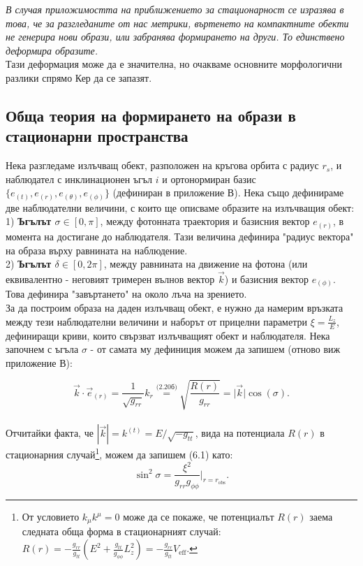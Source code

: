 \emph{В случая приложимостта на приближението за стационарност се изразява в това, че за разгледаните от нас метрики, въртенето на компактните обекти не генерира нови образи, или забранява формирането на други. То единствено деформира образите.}\\

Тази деформация може да е значителна, но очакваме основните морфологични разлики спрямо Кер да се запазят.

\subsection{Обща теория на формирането на образи в стационарни пространства}

Нека разгледаме излъчващ обект, разположен на кръгова орбита с радиус $r_s$, и наблюдател с инклинационен ъгъл $i$ и ортонормиран базис $\{e_{(t)}, e_{(r)}, e_{(\theta)}, e_{(\phi)}\}$ (дефиниран в приложение В). Нека също дефинираме две наблюдателни величини, с които ще описваме образите на излъчващия обект:\\

1) \textbf{Ъгълът $\sigma\in[0,\pi]$}, между фотонната траектория и базисния вектор $e_{(r)}$, в момента на достигане до наблюдателя. Тази величина дефинира "радиус вектора" на образа върху равнината на наблюдение.\\

2) \textbf{Ъгълът $\delta\in[0,2\pi]$}, между равнината на движение на фотона (или еквивалентно - неговият тримерен вълнов вектор $\vec{k}$) и базисния вектор $e_{(\phi)}$. Това дефинира "завъртането" на около лъча на зрението.\\

За да построим образа на даден излъчващ обект, е нужно да намерим връзката между тези наблюдателни величини и наборът от прицелни параметри $\xi = \frac{L_z}{E}$, дефиниращи криви, които свързват излъчващият обект и наблюдателя. Нека започнем с ъгъла $\sigma$ - от самата му дефиниция можем да запишем (отново виж приложение В):

\begin{equation}
	\vec{k} \cdot \vec{e}_{(r)} = \frac{1}{\sqrt{g_{rr}}}k_{r} \stackrel{\text{(2.20б)}}{=} \sqrt{\frac{R(r)}{g_{rr}}} =  \big\vert \vec{k}\big\vert \cos(\sigma).
\end{equation}\\
Отчитайки факта, че $|\vec{k}| = k^{(t)} = E/\sqrt{-g_{tt}}$,  вида на потенциала $R(r)$ в стационарния случай\footnote{От условието $k_\mu k^\mu = 0$ може да се покаже, че потенциалът $R(r)$ заема следната обща форма в стационарният случай: $R(r) = -\frac{g_{rr}}{g_{tt}}\left(E^2 + \frac{g_{tt}}{g_{\phi\phi}}L_z^2\right) = -\frac{g_{rr}}{g_{tt}} V_\text{eff}$.}, можем да запишем (6.1) като:
\begin{equation}
	\sin^2\sigma = \frac{\xi^2}{g_{rr}g_{\phi\phi}}\bigg\vert_{r = r_\text{obs}}.
\end{equation}

